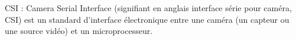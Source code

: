 \begin{definition}
    \newcommand{\lab}[1]{(\ref{#1})}
    CSI : Camera Serial Interface (signifiant en anglais interface série pour caméra, CSI) est un standard d'interface électronique entre une caméra (un capteur ou une source vidéo) et un microprocesseur.

\end{definition}


